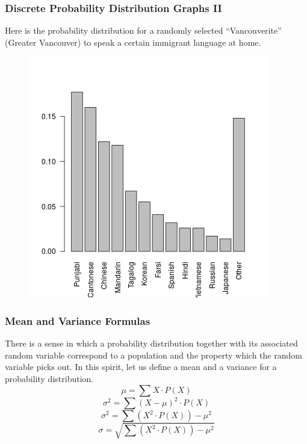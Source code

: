 \documentclass[xcolor=dvipsnames]{beamer}
\begin{document}
\begin{frame}
  \frametitle{Discrete Probability Distribution Graphs II}
  \label{ex:ahchoiyu} Here is the
  probability distribution for a randomly selected ``Vancouverite''
  (Greater Vancouver) to speak a certain immigrant language at home.

\vspace{-.5in}

\begin{figure}[h]
\includegraphics[scale=.5]{./diagrams/vanlang.png}
\end{figure}
\end{frame}

\begin{frame}
  \frametitle{Mean and Variance Formulas}
There is a sense in which a probability distribution together with its
associated random variable correspond to a population and the property
which the random variable picks out. In this spirit, let us define a
mean and a variance for a probability distribution.
\begin{equation}
  \label{eq:noohahfa}
  \mu=\sum{}X\cdot{}P(X)
\end{equation}
\begin{equation}
  \label{eq:axiengeb}
  \sigma^{2}=\sum(X-\mu)^{2}\cdot{}P(X)
\end{equation}
\begin{equation}
  \label{eq:teeneilu}
  \sigma^{2}=\sum(X^{2}\cdot{}P(X))-\mu^{2}
\end{equation}
\begin{equation}
  \label{eq:iifiekai}
  \sigma=\sqrt{\sum(X^{2}\cdot{}P(X))-\mu^{2}}
\end{equation}
\end{frame}
\end{document}
